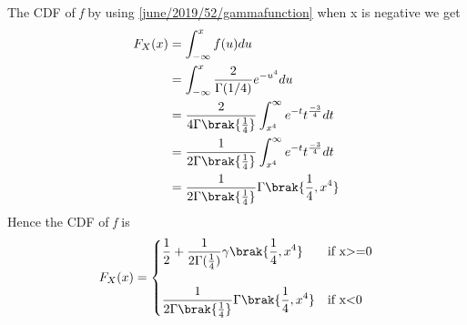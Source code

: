 The CDF of \textit{f} by using \eqref{june/2019/52/gammafunction} when x is negative we get
\begin{align}
    F_{X}(x) &=\int_{-\infty}^{x}f(u)du\\
             &=\int_{-\infty}^{x}\frac{2}{\Gamma(1/4)}e^{-u^{4}}du\\
             &=\frac{2}{4\Gamma\brak{\frac{1}{4}}}\int_{x^{4}}^{\infty}e^{-t}t^{\frac{-3}{4}}dt\\
             &=\frac{1}{2\Gamma\brak{\frac{1}{4}}}\int_{x^{4}}^{\infty}e^{-t}t^{\frac{-3}{4}}dt\\
             &=\frac{1}{2\Gamma\brak{\frac{1}{4}}}\Gamma\brak{\frac{1}{4},x^{4}}
\end{align}
Hence the CDF of \textit{f} is 
\begin{align}
    F_{X}(x)=
    \begin{cases}
      \displaystyle\frac{1}{2}+ \frac{1}{2\Gamma(\frac{1}{4})}\gamma\brak{\frac{1}{4},x^{4}}  &\text{if x$>$=0} \\\\
      \displaystyle\frac{1}{2\Gamma\brak{\frac{1}{4}}}\Gamma\brak{\frac{1}{4},x^{4}} & \text{if x$<$0}
    \end{cases}
\end{align}